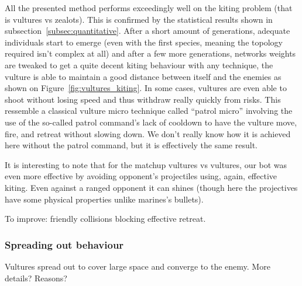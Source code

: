 All the presented method performs exceedingly well on the kiting problem (that is vultures vs zealots).
This is confirmed by the statistical results shown in subsection~\ref{subsec:quantitative}. After a short amount of generations, adequate
individuals start to emerge (even with the first species, meaning the topology required isn’t complex at all)
and after a few more generations, networks weights are tweaked to get a quite decent kiting behaviour with any
technique, the vulture is able to maintain a good distance between itself and the enemies as shown on
Figure~\ref{fig:vultures_kiting}. In some cases, vultures are even able to shoot without
losing speed and thus withdraw really quickly from risks. This ressemble
a classical vulture micro technique called “patrol micro” involving the use of the so-called patrol command's
lack of cooldown to have the vulture move, fire, and retreat without slowing down. We don’t really know how it
is achieved here without the patrol command, but it is effectively the same result.

It is interesting to note that for the matchup vultures vs vultures, our bot was even more effective by avoiding opponent's
projectiles using, again, effective kiting. Even against a ranged opponent it can shines (though here the projectives have
some physical properties unlike marines's bullets).

To improve: friendly collisions blocking effective retreat.

\subsubsection{Spreading out behaviour}

Vultures spread out to cover large space and converge to the enemy. More details? Reasons?

